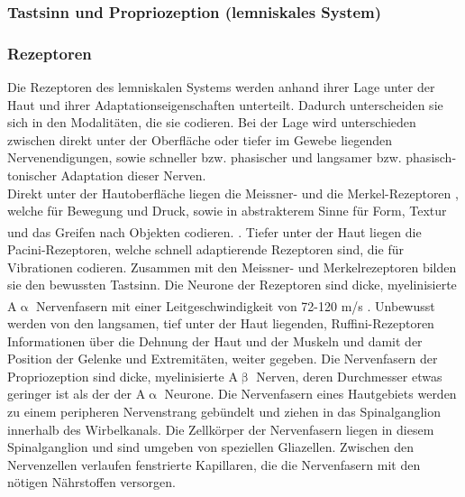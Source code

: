 \documentclass[12pt,a4paper,pdftex]{article}
\begin{document}
\subsubsection{Tastsinn und Propriozeption (lemniskales System)} \label{subsubsec:tastsinn}

\subsubsection*{Rezeptoren}
Die Rezeptoren  des lemniskalen Systems werden anhand ihrer Lage unter der Haut und ihrer Adaptationseigenschaften unterteilt. Dadurch unterscheiden sie sich in den Modalitäten, die sie codieren. Bei der Lage wird unterschieden zwischen direkt unter der Oberfläche oder tiefer im Gewebe liegenden Nervenendigungen, sowie schneller bzw. phasischer und langsamer bzw. phasisch-tonischer Adaptation dieser Nerven.\\
Direkt unter der Hautoberfläche liegen die Meissner- und die Merkel-Rezeptoren , welche für Bewegung und Druck, sowie in abstrakterem Sinne für Form, Textur und das Greifen nach Objekten codieren.
\textsuperscript{\cite[24]{paxinos2014rat}}. Tiefer unter der Haut liegen die Pacini-Rezeptoren, welche schnell adaptierende Rezeptoren sind, die für Vibrationen codieren. Zusammen mit den Meissner- und Merkelrezeptoren bilden sie den bewussten Tastsinn. Die Neurone der Rezeptoren sind dicke, myelinisierte A$\upalpha$ Nervenfasern mit einer Leitgeschwindigkeit von 72-120 m/s \textsuperscript{\cite[22]{kandel2013principles}}. Unbewusst werden von den langsamen, tief unter der Haut liegenden, Ruffini-Rezeptoren  Informationen über die Dehnung der Haut und der Muskeln und damit der Position der Gelenke und Extremitäten, weiter gegeben.
Die Nervenfasern der Propriozeption sind dicke, myelinisierte A$\upbeta$ Nerven, deren Durchmesser etwas geringer ist als der der A$\upalpha$ Neurone.
Die Nervenfasern eines Hautgebiets werden zu einem peripheren Nervenstrang gebündelt und ziehen in das Spinalganglion  innerhalb des Wirbelkanals. Die Zellkörper der Nervenfasern liegen in diesem Spinalganglion und sind umgeben von speziellen Gliazellen. Zwischen den Nervenzellen verlaufen fenstrierte Kapillaren, die die Nervenfasern mit den nötigen Nährstoffen versorgen. 
\end{document}
